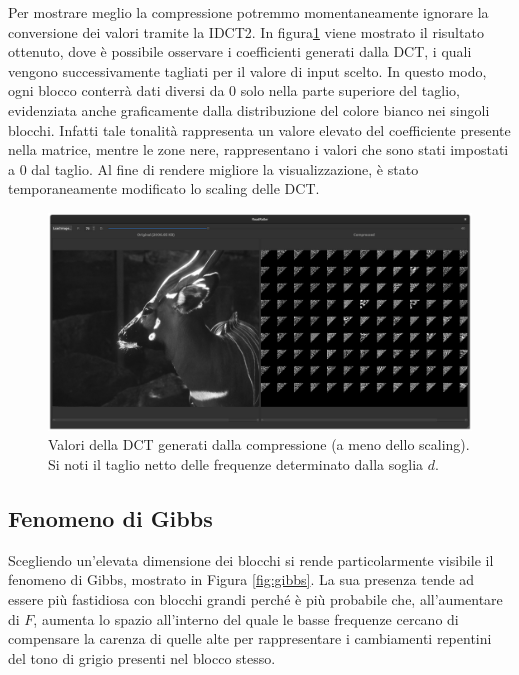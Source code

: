 Per mostrare meglio la compressione potremmo momentaneamente ignorare la conversione dei valori tramite la IDCT2. In figura\ref{fig:compression_values} viene mostrato il risultato ottenuto, dove è possibile osservare i coefficienti generati dalla DCT, i quali vengono successivamente tagliati per il valore di input scelto. In questo modo, ogni blocco conterrà dati diversi da 0 solo nella parte superiore del taglio, evidenziata anche graficamente dalla distribuzione del colore bianco nei singoli blocchi. Infatti tale tonalità rappresenta un valore elevato del coefficiente presente nella matrice, mentre le zone nere, rappresentano i valori che sono stati impostati a 0 dal taglio. Al fine di rendere migliore la visualizzazione, è stato temporaneamente modificato lo scaling delle DCT.

\begin{figure}[h]
	\centering
	\includegraphics[width=1\linewidth]{figures/qt_dct_values}
	\caption{Valori della DCT generati dalla compressione (a meno dello scaling). Si noti il taglio netto delle frequenze determinato dalla soglia $d$.}
	\label{fig:compression_values}
\end{figure}

\subsection{Fenomeno di Gibbs}

Scegliendo un'elevata dimensione dei blocchi si rende particolarmente visibile il fenomeno di Gibbs, mostrato in Figura \ref{fig:gibbs}. La sua presenza tende ad essere più fastidiosa con blocchi grandi perché è più probabile che, all'aumentare di $F$, aumenta lo spazio all'interno del quale le basse frequenze cercano di compensare la carenza di quelle alte per rappresentare i cambiamenti repentini del tono di grigio presenti nel blocco stesso.

